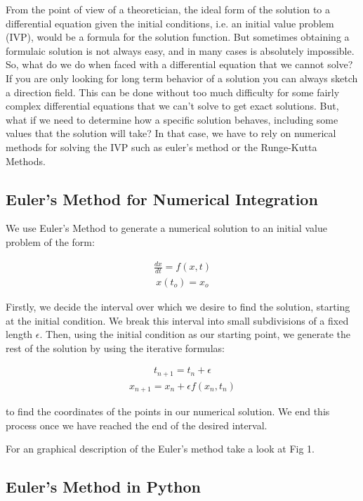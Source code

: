 \documentclass[10pt,letterpaper]{article}
\begin{document}
From the point of view of a theoretician, the ideal form of the solution to a differential equation given the initial conditions, i.e. an initial value problem (IVP), would be a formula for the solution function. But sometimes obtaining a formulaic solution is not always easy, and in many cases is absolutely impossible. So, what do we do when faced with a differential equation that we cannot solve? If you are only looking for long term behavior of a solution you can always sketch a direction field. This can be done without too much difficulty for some fairly complex differential equations that we can’t solve to get exact solutions. But, what if we need to determine how a specific solution behaves, including some values that the solution will take? In that case, we have to rely on numerical methods for solving the IVP such as euler's method or the Runge-Kutta Methods. 

\subsection*{Euler's Method for Numerical Integration}

We use Euler's Method to generate a numerical solution to an initial value problem of the form:

\begin{eqnarray}\frac{dx}{dt} = f(x, t)\end{eqnarray}
\begin{eqnarray}x(t_o) = x_o\end{eqnarray}

Firstly, we decide the interval over which we desire to find the solution, starting at the initial condition. We break this interval into small subdivisions of a fixed length $\epsilon$. Then, using the initial condition as our starting point, we generate the rest of the solution by using the iterative formulas:

\begin{eqnarray} t_{n+1} = t_n + \epsilon \end{eqnarray}
\begin{eqnarray} x_{n+1} = x_n + \epsilon f(x_n, t_n) \end{eqnarray}

to find the coordinates of the points in our numerical solution. We end this process once we have reached the end of the desired interval.

For an graphical description of the Euler's method take a look at Fig 1.

\subsection*{Euler's Method in Python}
\end{document}
